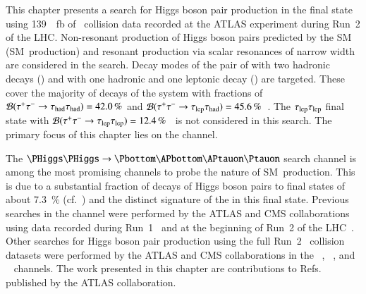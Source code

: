 This chapter presents a search for Higgs boson pair production in the \bbtautau
final state using \SI{139}{\per\femto\barn} of \pp~collision data recorded at
the ATLAS experiment during Run~2 of the LHC. Non-resonant production of Higgs
boson pairs predicted by the SM (SM~\HH production) and resonant production via
scalar resonances of narrow width are considered in the search. Decay modes of
the pair of \tauleptons with two hadronic \taulepton decays (\hadhad) and with
one hadronic and one leptonic \taulepton decay (\lephad) are targeted. These
cover the majority of decays of the \tautau system with fractions of
$\mathcal{B}(\tau^{+} \tau^{-} \to \tau_{\text{had}}\tau_{\text{had}}) = \SI{42.0}{\percent}$ and
$\mathcal{B}(\tau^{+} \tau^{-} \to \tau_{\text{lep}}\tau_{\text{had}}) =
\SI{45.6}{\percent}$~\cite{Zyla:2020zbs}. The $\tau_{\text{lep}}\tau_{\text{lep}}$ final state with
$\mathcal{B}(\tau^{+} \tau^{-} \to \tau_{\text{lep}}\tau_{\text{lep}}) =
\SI{12.4}{\percent}$~\cite{Zyla:2020zbs} is not considered in this search. The
primary focus of this chapter lies on the \hadhad channel.

The $\HH \to \bbtautau$ search channel is among the most promising channels to
probe the nature of SM~\HH production. This is due to a substantial fraction of
decays of Higgs boson pairs to \bbtautau final states of about
\SI{7.3}{\percent} (cf.~) and the distinct
signature of the \tauleptons in this final state. Previous searches in the
\bbtautau channel were performed by the ATLAS and CMS collaborations using data
recorded during Run~1~\cite{HIGG-2013-33,CMS-HIG-15-013} and at the beginning of
Run~2 of the LHC~\cite{HIGG-2016-16-witherratum,CMS-HIG-17-002}.  Other searches
for Higgs boson pair production using the full Run~2 \pp~collision datasets were
performed by the ATLAS and CMS collaborations in the
\bbtautau~\cite{CMS-PAS-HIG-20-010},
\bbbb~\cite{ATLAS-CONF-2022-035,CMS-HIG-20-005}, and
\bbyy~\cite{HDBS-2018-34,CMS-HIG-19-018} channels.
The work presented in this chapter are contributions to
Refs.~\cite{ATLAS-CONF-2021-030,HDBS-2018-40} published by the ATLAS
collaboration.

